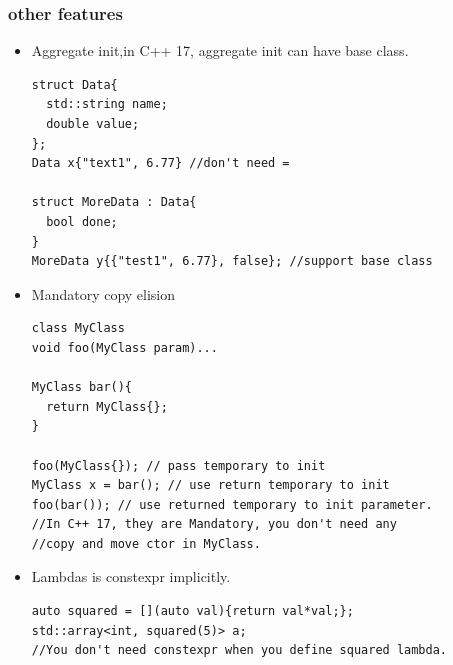 \documentclass[a4paper,11pt,twoside]{book}
\begin{document}
\subsubsection{other features}
\begin{itemize}
\item Aggregate init,in C++ 17, aggregate init can have base class.
\begin{lstlisting}
struct Data{
  std::string name;
  double value;
};
Data x{"text1", 6.77} //don't need =

struct MoreData : Data{
  bool done;
}
MoreData y{{"test1", 6.77}, false}; //support base class
\end{lstlisting}
\item Mandatory copy elision
\begin{lstlisting}
class MyClass
void foo(MyClass param)...

MyClass bar(){
  return MyClass{};
}

foo(MyClass{}); // pass temporary to init
MyClass x = bar(); // use return temporary to init
foo(bar()); // use returned temporary to init parameter.
//In C++ 17, they are Mandatory, you don't need any 
//copy and move ctor in MyClass.
\end{lstlisting}
\item Lambdas is constexpr implicitly.
\begin{lstlisting}
auto squared = [](auto val){return val*val;};
std::array<int, squared(5)> a;
//You don't need constexpr when you define squared lambda.
\end{lstlisting}

\end{itemize}
\end{document}
